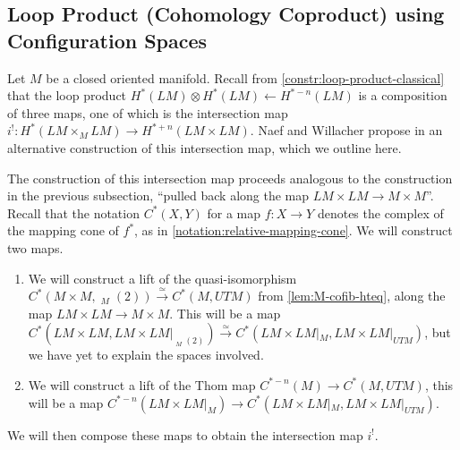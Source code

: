 \documentclass{scrartcl}
\theoremstyle{plain}
\theoremstyle{definition}
\newcommand{\quiso}{\simeq}
\newcommand{\from}{\leftarrow}
\let\xto\xrightarrow
\DeclareMathOperator{\cConf}{\overline{Conf}}
\begin{document}
\subsection{Loop Product (Cohomology Coproduct) using Configuration Spaces}\label{subsec:loop-product}
Let $M$ be a closed oriented manifold. Recall from \cref{constr:loop-product-classical} that the loop product $H^*(LM)\otimes H^*(LM)\from H^{*-n}(LM)$ is a composition of three maps, one of which is the intersection map $i^! \colon H^*(LM\times_M LM)\to H^{*+n}(LM\times LM)$. Naef and Willacher propose in \cite{naef2019string} an alternative construction of this intersection map, which we outline here. 

The construction of this intersection map proceeds analogous to the construction in the previous subsection, ``pulled back along the map $LM\times LM\to M\times M$''. Recall that the notation $C^*(X, Y)$ for a map $f\colon X\to Y$ denotes the complex of the mapping cone of $f^*$, as in \cref{notation:relative-mapping-cone}. We will construct two maps. 
\begin{enumerate}[(1)]
    \item We will construct a lift of the quasi-isomorphism $C^*(M\times M, \cConf_M(2)) \xto{\quiso} C^*(M, UTM)$ from \cref{lem:M-cofib-hteq}, along the map $LM\times LM\to M\times M$. This will be a map $C^*(LM\times LM, LM\times LM|_{\cConf_M(2)}) \xto{\quiso} C^*(LM\times LM|_M, LM\times LM|_{UTM})$, but we have yet to explain the spaces involved.
    \item We will construct a lift of the Thom map $C^{*-n}(M)\to C^*(M, UTM)$, this will be a map $C^{*-n}(LM\times LM|_M) \to C^*(LM\times LM|_M, LM\times LM|_{UTM})$.
\end{enumerate}
We will then compose these maps to obtain the intersection map $i^!$. 
\end{document}
